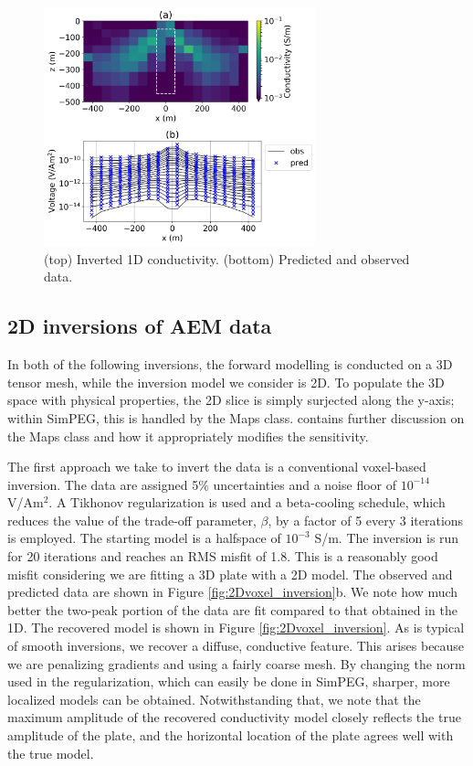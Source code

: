 \documentclass[paper]{geophysics}
\begin{document}
\begin{figure}[!htb]
  \centering
  \includegraphics[width=0.7\textwidth]{figures/1Dinversion.png}
  \caption{(top) Inverted 1D conductivity. (bottom) Predicted and observed data.}
  \label{fig:1Dinversion}
\end{figure}


\subsection{2D inversions of AEM data}

In both of the following inversions, the forward modelling is conducted on a 3D tensor mesh, while the inversion model we consider is 2D. To populate the 3D space with physical properties, the 2D slice is simply surjected along the y-axis; within SimPEG, this is handled by the Maps class. \cite{kang2015c} contains further discussion on the Maps class and how it appropriately modifies the sensitivity.

The first approach we take to invert the data is a conventional voxel-based inversion. The data are assigned 5$\%$ uncertainties and a noise floor of $10^{-14}$ V/Am$^2$. A Tikhonov regularization is used and a beta-cooling schedule, which reduces the value of the trade-off parameter, $\beta$, by a factor of 5 every 3 iterations is employed. The starting model is a halfspace of $10^{-3}$ S/m. The inversion is run for 20 iterations and reaches an RMS misfit of 1.8. This is a reasonably good misfit considering we are fitting a 3D plate with a 2D model. The observed and predicted data are shown in Figure \ref{fig:2Dvoxel_inversion}b. We note how much better the two-peak portion of the data are fit compared to that obtained in the 1D. The recovered model is shown in Figure \ref{fig:2Dvoxel_inversion}. As is typical of smooth inversions, we recover a diffuse, conductive feature. This arises because we are penalizing gradients and using a fairly coarse mesh. By changing the norm used in the regularization, which can easily be done in SimPEG, sharper, more localized models can be obtained. Notwithstanding that, we note that the maximum amplitude of the recovered conductivity model closely reflects the true amplitude of the plate, and the horizontal location of the plate agrees well with the true model.
\end{document}
